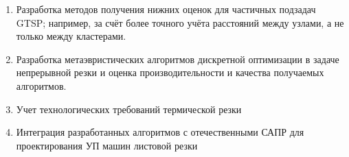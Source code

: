 \begin{enumerate}
    \item
    Разработка методов получения нижних оценок для частичных подзадач GTSP;
    например, за счёт более точного учёта расстояний между узлами,
    а не только между кластерами.
    \item
    Разработка метаэвристических алгоритмов дискретной оптимизации в задаче
    непрерывной резки и оценка производительности и качества получаемых
    алгоритмов.
    \item
    Учет технологических требований термической резки
    \item
    Интеграция разработанных алгоритмов с отечественными САПР
    для проектирования УП машин листовой резки
\end{enumerate}
